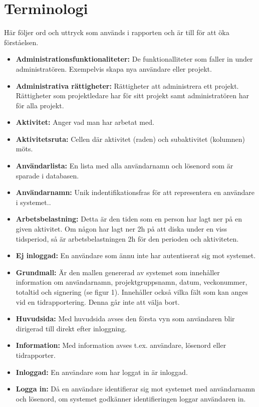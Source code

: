 \documentclass[a4paper]{article}
\begin{document}
\section{Terminologi}
\label{terminologi}
Här följer ord och uttryck som används i rapporten och är till för att öka förståelsen.
\begin{itemize}
\item [] \textbf{Administrationsfunktionaliteter:} De funktionalliteter som faller in under administratören. Exempelvis skapa nya användare eller projekt.
\item [] \textbf{Administrativa rättigheter:} Rättigheter att administrera ett projekt. Rättigheter som projektledare har för sitt projekt samt administratören har för alla projekt.
\item [] \textbf{Aktivitet:} Anger vad man har arbetat med.
\item [] \textbf{Aktivitetsruta:} Cellen där aktivitet (raden) och subaktivitet (kolumnen) möts.
\item [] \textbf{Användarlista:} En lista med alla användarnamn och lösenord som är sparade i databasen.
\item [] \textbf{Användarnamn:} Unik indentifikationsfras för att representera en användare i systemet..
\item [] \textbf{Arbetsbelastning:} Detta är den tiden som en person har lagt ner på en given aktivitet. Om någon har lagt ner 2h på att diska under en viss tidsperiod, så är arbetsbelastningen 2h för den perioden och aktiviteten.
\item [] \textbf{Ej inloggad:} En användare som ännu inte har autentiserat sig mot systemet.
\item [] \textbf{Grundmall:} Är den mallen genererad av systemet som innehåller information om användarnamn, projektgruppsnamn, datum, veckonummer, totaltid och signering (se figur 1). Innehåller också vilka fält som kan anges vid en tidrapportering. Denna går inte att välja bort.
\item [] \textbf{Huvudsida:} Med huvudsida avses den första vyn som användaren blir dirigerad till direkt efter inloggning. 
\item [] \textbf{Information:} Med information avses t.ex. användare, lösenord eller tidrapporter.
\item [] \textbf{Inloggad:} En användare som har loggat in är inloggad.
\item [] \textbf{Logga in:} Då en användare identifierar sig mot systemet med användarnamn och lösenord, om systemet godkänner identifieringen loggar användaren in.

\end{itemize}
\end{document}
